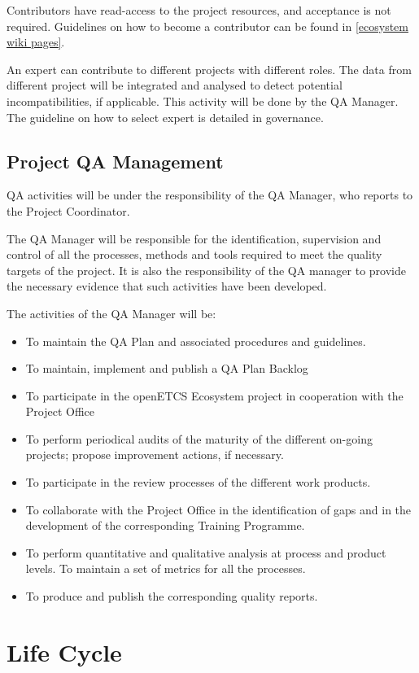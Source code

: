 \documentclass{template/openetcs_article}
\begin{document}
Contributors have read-access to the project resources, and acceptance is not required. Guidelines on how to become a contributor can be found in \href{https://github.com/openETCS/ecosystem/wiki/_pages}{[ecosystem wiki pages]}.

An expert can contribute to different projects with different roles. The data from different project will be integrated and analysed to detect potential incompatibilities, if applicable. This activity will be done by the QA Manager. The guideline on how to select expert is detailed in governance.


\subsection{Project QA Management}
QA activities will be under the responsibility of the QA Manager, who reports to the Project Coordinator.

The QA Manager will be responsible for the identification, supervision and control of all the processes, methods and tools required to meet the quality targets of the project. It is also the responsibility of the QA manager to provide the necessary evidence that such activities have been developed.

The activities of the QA Manager will be:
\begin{itemize}
\item To maintain the QA Plan and associated procedures and guidelines. 
\item To maintain, implement and publish a QA Plan Backlog
\item To participate in the openETCS Ecosystem project in cooperation with the Project Office
\item To perform periodical audits of the maturity of the different on-going projects; propose improvement actions, if necessary.
\item To participate in the review processes of the different work products.
\item To collaborate with the Project Office in the identification of gaps and in the development of the corresponding Training Programme.
\item To perform quantitative and qualitative analysis at process and product levels. To maintain a set of metrics for all the processes.
\item To produce and publish the corresponding quality reports.
\end{itemize}


\newpage
\section{Life Cycle}
\end{document}
